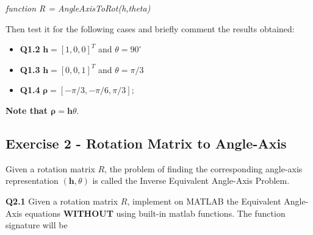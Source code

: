 \begin{center}\textit{function R = AngleAxisToRot(h,theta)}\end{center}


Then test it for the following cases and briefly comment the results obtained:
\begin{itemize}
    \item \textbf{Q1.2}\hspace{10mm} \begin{math} \textbf{h} = [1,0,0]^T\end{math} and  \begin{math} \theta = 90^\circ \end{math}
    \item \textbf{Q1.3}\hspace{10mm} \begin{math} \textbf{h} = [0,0,1]^T\end{math} and  \begin{math} \theta = \pi/3 \end{math}
    \item \textbf{Q1.4}\hspace{10mm} \begin{math} \mathbf{\rho} = [-\pi/3, -\pi/6 ,\pi/3];\end{math}
\end{itemize}
\textbf{Note that $\mathbf{\rho} = \textbf{h}\theta$}.
\subsection{Exercise 2 - Rotation Matrix to Angle-Axis}
Given a rotation matrix \begin{math}R\end{math}, the problem of finding the corresponding angle-axis representation \begin{math}(\textbf{h},\theta)\end{math} is called the Inverse Equivalent Angle-Axis Problem.
\newline


\textbf{Q2.1} Given a rotation matrix \begin{math}R\end{math}, implement on MATLAB the Equivalent Angle-Axis equations \textbf{WITHOUT} using built-in matlab functions. The function signature will be


